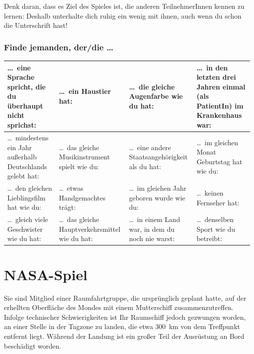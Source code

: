 Denk daran, dass es Ziel des Spieles ist, die anderen TeilnehmerInnen kennen zu lernen: Deshalb unterhalte dich ruhig ein wenig mit ihnen, auch wenn du schon die Unterschrift hast!

\subsection*{Finde jemanden, der/die \ldots}

\renewcommand{\arraystretch}{1.27}
\noindent\begin{tabular}{|p{9.0em}|p{9.0em}|p{9.0em}|p{9.0em}|}
\hline
\ldots\ eine Sprache spricht, die du überhaupt nicht sprichst:&
\ldots\ ein Haustier hat:&
\ldots\ die gleiche Augenfarbe wie du hat:\vspace{5.5em}&
\ldots\ in den letzten drei Jahren einmal (als PatientIn) im Krankenhaus war:\\
\hline
\ldots\ mindestens ein Jahr außerhalb Deutschlands gelebt hat:&
\ldots\ das gleiche Musikinstrument spielt wie du:\vspace{4.5em}&
\ldots\ eine andere Staatsangehörigkeit als du hat:&
\ldots\ im gleichen Monat Geburtstag hat wie du:\\
\hline
\ldots\ den gleichen Lieblingsfilm hat wie du:&
\ldots\ etwas Handgemachtes trägt:\vspace{5.5em}&
\ldots\ im gleichen Jahr geboren wurde wie du:&
\ldots\ keinen Fernseher hat:\\
\hline
\ldots\ gleich viele Geschwister wie du hat:\vspace{5.5em}&
\ldots\ das gleiche Hauptverkehrsmittel wie du hat:&
\ldots\ in einem Land war, in dem du noch nie warst:&
\ldots\ denselben Sport wie du betreibt:\\
\hline
\end{tabular}
\renewcommand{\arraystretch}{1.0}

\chapter{NASA-Spiel}
\label{nasa-kopien}

Sie sind Mitglied einer Raumfahrtgruppe, die ursprünglich geplant hatte, auf der erhellten Oberfläche des Mondes mit einem Mutterschiff zusammenzutreffen. Infolge technischer Schwierigkeiten ist Ihr Raumschiff jedoch gezwungen worden, an einer Stelle in der Tagzone zu landen, die etwa 300~km von dem Treffpunkt entfernt liegt. Während der Landung ist ein großer Teil der Ausrüstung an Bord beschädigt worden.

